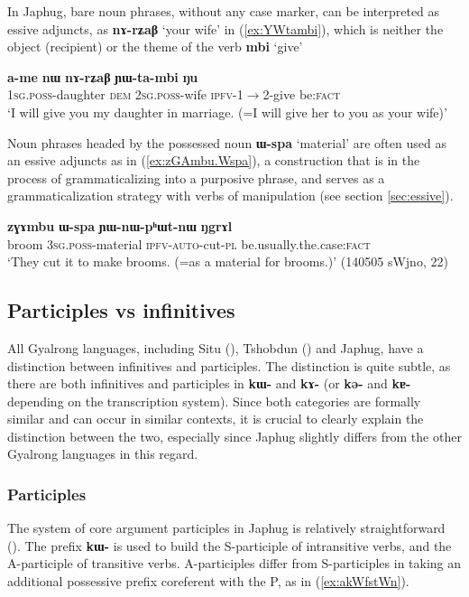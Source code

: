 \documentclass[oneside,a4paper,11pt]{article}
\newcommand{\ipa}[1]{\textbf{\phon#1}} %
\newcommand{\jpg}[2]{\ipa{#1} `#2'} %
\begin{document}
In Japhug, bare noun phrases, without any case marker, can be interpreted as essive adjuncts, as \ipa{nɤ-rʑaβ} `your wife' in (\ref{ex:YWtambi}), which is neither the object (recipient) or the theme of the verb \jpg{mbi}{give}

\begin{exe}
\ex \label{ex:YWtambi}
\gll \ipa{a-me} 	\ipa{nɯ} 	\ipa{nɤ-rʑaβ} 	\ipa{ɲɯ-ta-mbi} 	\ipa{ŋu} \\
\textsc{1sg.poss}-daughter \textsc{dem} \textsc{2sg.poss}-wife \textsc{ipfv}-1$\rightarrow$2-give be:\textsc{fact} \\
\glt `I will give you my daughter in marriage. (=I will give her to you as your wife)'
\end{exe}

Noun phrases headed by the possessed noun \jpg{ɯ-spa}{material} are often used as an essive adjuncts as in (\ref{ex:zGAmbu.Wspa}), a construction that is in the process of grammaticalizing into a purposive phrase, and serves as a grammaticalization strategy with verbs of manipulation (see section \ref{sec:essive}).

\begin{exe}
\ex \label{ex:zGAmbu.Wspa}
\gll \ipa{zɣɤmbu} 	\ipa{ɯ-spa} 	\ipa{ɲɯ-nɯ-pʰɯt-nɯ} 	\ipa{ŋgrɤl} \\
broom \textsc{3sg.poss}-material \textsc{ipfv-auto}-cut-\textsc{pl} be.usually.the.case:\textsc{fact} \\
\glt `They cut it to make brooms. (=as a material for brooms.)' (140505 sWjno, 22)
\end{exe}

\subsection{Participles vs infinitives} \label{sec:part.inf}
All Gyalrong languages, including Situ (\citealt{youjing03zhuokeji}), Tshobdun (\citealt{sun12complementation}) and Japhug, have a distinction between infinitives and participles. The distinction is quite subtle, as there are both infinitives and participles in \ipa{kɯ-} and \ipa{kɤ-} (or \ipa{kə-} and \ipa{kɐ-} depending on the transcription system). Since both categories are formally similar and can occur in similar contexts, it is crucial to clearly explain the distinction between the two, especially since Japhug slightly differs from the other Gyalrong languages in this regard.

\subsubsection{Participles}
The system of core argument participles in Japhug is relatively straightforward (\citealt{jacques16relatives}). The prefix \ipa{kɯ-} is used to build the S-participle of intransitive verbs, and the A-participle of transitive verbs. A-participles differ from S-participles in taking an additional possessive prefix coreferent with the P, as in (\ref{ex:akWfstWn}).
\end{document}
